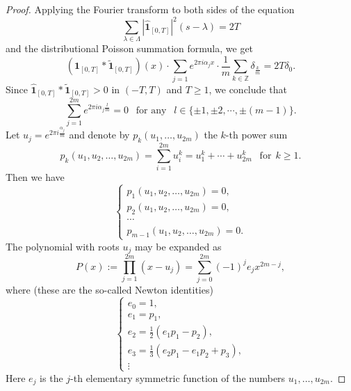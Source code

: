 \documentclass[12pt,a4paper,intlimits,sumlimits]{amsart}
\theoremstyle{plain}
\theoremstyle{definition}
\begin{document}
\begin{proof}
 Applying the Fourier transform to both sides of the equation 
 $$\sum_{\lambda  \in \Lambda }\left|\hat{ \mathbf{1}}_{\left[0, T \right]}\right|^2\left(s-\lambda\right) = 2T$$
 and the distributional Poisson summation formula, we get
$$
( { \mathbf{1}}_{\left[0, T\right]}* \widetilde{ \mathbf{1}}_{\left[0, T\right]})(x) \cdot \sum_{j=1} e^{2 \pi i \alpha_j x}\cdot \frac{1}{m} \sum_{k \in \mathbb{Z}} \delta_{\frac{k}{m}}=2 T \delta_0.
$$
Since  $\hat{ \mathbf{1}}_{\left[0, T\right]}* \tilde{ \mathbf{1}}_{\left[0, T\right]} > 0$ in $(-T, T)$ and $T\geq 1$, we conclude that
$$
\sum_{j=1}^{2m} e^{2 \pi i \alpha_j\frac{l}{m}}=0\ \ \text{ for any }\ \ l\in\{ \pm 1,  \pm2, \cdots,  \pm  (m-1)\}.
$$  
Let $u_j=e^{2 \pi i \frac{\alpha_j}{m}}$ and  
 denote    by  $p_k\left(u_1, \ldots, u_{2m}\right)$   the $k$-th power sum
$$
p_k\left(u_1, u_2, \ldots, u_{2m}\right)=\sum_{i=1}^{2m} u_i^k=u_1^k+\cdots+u_{2m}^k 
\ \   \text{ for} \ \  k \geqslant 1.
$$
Then we have 
\begin{equation}\label{eq(0.002)}
\begin{cases}
p_1\left(u_1, u_2, \ldots, u_{2m}\right)=0,\\[6pt]
p_2\left(u_1, u_2, \ldots, u_{2m}\right)=0,\\[6pt]
  \cdots  \\%
 p_{m-1}\left(u_1, u_2, \ldots, u_{2m}\right)=0. 
 \end{cases}
\end{equation}
The polynomial with roots $u_j$  may be expanded as
$$
P(x):=\prod_{j=1}^{2m}\left(x-u_j\right)=\sum_{j=0}^{2m}(-1)^j e_j x^{2m-j},
$$
where (these are the so-called Newton identities)
\begin{equation*}
\begin{cases} 
e_0 =1, \\[6pt]
e_1 =p_1, \\[6pt]
e_2 =\frac{1}{2}\left(e_1 p_1-p_2\right),\\[6pt]
e_3 =\frac{1}{3}\left(e_2 p_1-e_1 p_2+p_3\right),\\%
 \vdots
\end{cases}
\end{equation*}
Here $e_j$ is the $j$-th elementary symmetric function of the numbers $u_1, \ldots, u_{2m}$.


\end{proof}
\end{document}
